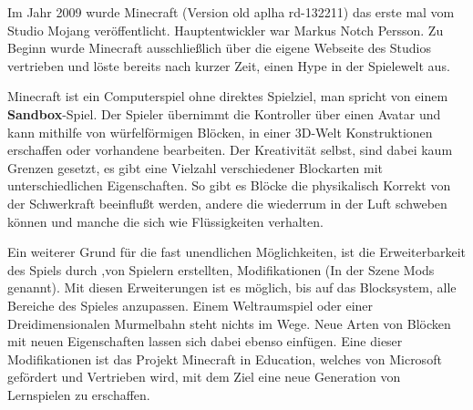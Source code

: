 Im Jahr 2009 wurde Minecraft (Version old aplha rd-132211) das erste mal vom
Studio Mojang veröffentlicht. Hauptentwickler war Markus Notch Persson. Zu Beginn wurde Minecraft
ausschließlich über die eigene Webseite des Studios vertrieben und löste bereits nach kurzer Zeit,
einen Hype in der Spielewelt aus. 
\cite{WikiMinecraft}

Minecraft ist ein Computerspiel ohne direktes Spielziel, man spricht von einem \textbf{Sandbox}-Spiel.
Der Spieler übernimmt die Kontroller über einen Avatar und kann mithilfe von würfelförmigen Blöcken,
in einer 3D-Welt Konstruktionen erschaffen oder vorhandene bearbeiten. Der Kreativität selbst,
sind dabei kaum Grenzen gesetzt, es gibt eine Vielzahl verschiedener Blockarten mit unterschiedlichen
Eigenschaften. So gibt es Blöcke die physikalisch Korrekt von der Schwerkraft beeinflußt werden,
andere die wiederrum in der Luft schweben können und manche die sich wie Flüssigkeiten verhalten.
\cite{WikiMinecraft}

Ein weiterer Grund für die fast unendlichen Möglichkeiten, ist die Erweiterbarkeit des Spiels durch
,von Spielern erstellten, Modifikationen (In der Szene Mods genannt). Mit diesen Erweiterungen ist es
möglich, bis auf das Blocksystem, alle Bereiche des Spieles anzupassen. Einem Weltraumspiel oder einer
Dreidimensionalen Murmelbahn steht nichts im Wege. Neue Arten von Blöcken mit neuen Eigenschaften lassen
sich dabei ebenso einfügen. Eine dieser Modifikationen ist das Projekt Minecraft in Education, welches
von Microsoft gefördert und Vertrieben wird, mit dem Ziel eine neue Generation von Lernspielen zu erschaffen.
